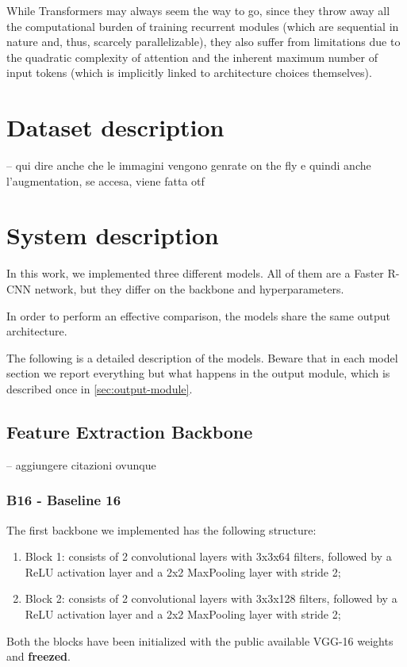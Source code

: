 \documentclass[a4paper,10pt]{report}
\begin{document}
While Transformers may always seem the way to go, since they throw away all the computational burden of training recurrent modules (which are sequential in nature and, thus, scarcely parallelizable), they also suffer from limitations due to the quadratic complexity of attention and the inherent maximum number of input tokens (which is implicitly linked to architecture choices themselves).

\chapter{Dataset description}\label{chap:dataset-description}

-- qui dire anche che le immagini vengono genrate on the fly e quindi anche l'augmentation, se accesa, viene fatta otf
\chapter{System description}\label{chap:system-description}

In this work, we implemented three different models. All of them are a Faster R-CNN network, but they differ on the backbone and hyperparameters.

In order to perform an effective comparison, the models share the same output architecture.

The following is a detailed description of the models. Beware that in each model section we report everything but what happens in the output module, which is described once in \ref{sec:output-module}.

\section{Feature Extraction Backbone}\label{sec:feature-extraction-backbone}
-- aggiungere citazioni ovunque
\subsection{B16 - Baseline 16}\label{subsec:b16}

The first backbone we implemented has the following structure:
\begin{enumerate}
  \item Block 1: consists of 2 convolutional layers with 3x3x64 filters, followed by a ReLU activation layer and a 2x2 MaxPooling layer with stride 2;
  \item Block 2: consists of 2 convolutional layers with 3x3x128 filters, followed by a ReLU activation layer and a 2x2 MaxPooling layer with stride 2;
\end{enumerate}
Both the blocks have been initialized with the public available VGG-16 weights and \textbf{freezed}.
\end{document}
